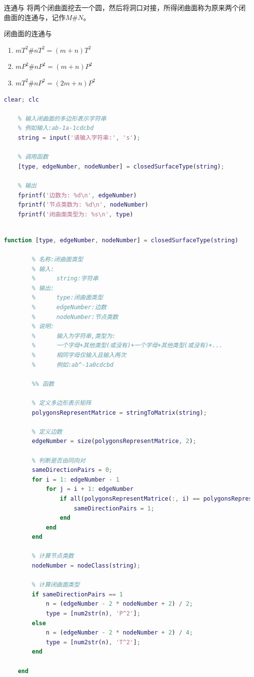 \documentclass[lang = cn, scheme = chinese, thmcnt = section, usesamecnt]{elegantbook}
\begin{document}
\begin{definition}{连通与}
	将两个闭曲面挖去一个圆，然后将洞口对接，所得闭曲面称为原来两个闭曲面的连通与，记作$M\# N$。
\end{definition}

\begin{theorem}{闭曲面的连通与}
	\begin{enumerate}
		\item $mT^2\# nT^2=(m+n)T^2$
		\item $mP^2\# nP^2=(m+n)P^2$
		\item $mT^2\# nP^2=(2m+n)P^2$
	\end{enumerate}
\end{theorem}

\begin{lstlisting}[language = Matlab, caption = {闭曲面分类定理主函数}]
	clear; clc
	
	% 输入闭曲面的多边形表示字符串
	% 例如输入:ab-1a-1cdcbd
	string = input('请输入字符串:', 's');
	
	% 调用函数
	[type, edgeNumber, nodeNumber] = closedSurfaceType(string);
	
	% 输出
	fprintf('边数为: %d\n', edgeNumber)
	fprintf('节点类数为: %d\n', nodeNumber)
	fprintf('闭曲面类型为: %s\n', type)
	
\end{lstlisting}

\begin{lstlisting}[language = Matlab, caption = {闭曲面类型函数}]
	function [type, edgeNumber, nodeNumber] = closedSurfaceType(string)
	    
	    % 名称:闭曲面类型
	    % 输入:
	    %      string:字符串
	    % 输出:
	    %      type:闭曲面类型
	    %      edgeNumber:边数
	    %      nodeNumber:节点类数
	    % 说明:
	    %      输入为字符串,类型为:
	    %      一个字母+其他类型(或没有)+一个字母+其他类型(或没有)+...
	    %      相同字母仅输入且输入两次
	    %      例如:ab^-1a0cdcbd
	
	    %% 函数
	
	    % 定义多边形表示矩阵
	    polygonsRepresentMatrice = stringToMatrix(string);
	
	    % 定义边数
	    edgeNumber = size(polygonsRepresentMatrice, 2);
	
	    % 判断是否由同向对
	    sameDirectionPairs = 0;
	    for i = 1: edgeNumber - 1
	        for j = i + 1: edgeNumber
	            if all(polygonsRepresentMatrice(:, i) == polygonsRepresentMatrice(:, j))
	                sameDirectionPairs = 1;
	            end
	        end
	    end
	
	    % 计算节点类数
	    nodeNumber = nodeClass(string);
	
	    % 计算闭曲面类型
	    if sameDirectionPairs == 1
	        n = (edgeNumber - 2 * nodeNumber + 2) / 2;
	        type = [num2str(n), 'P^2'];
	    else
	        n = (edgeNumber - 2 * nodeNumber + 2) / 4;
	        type = [num2str(n), 'T^2'];
	    end
	
	end
	
\end{lstlisting}
\end{document}

